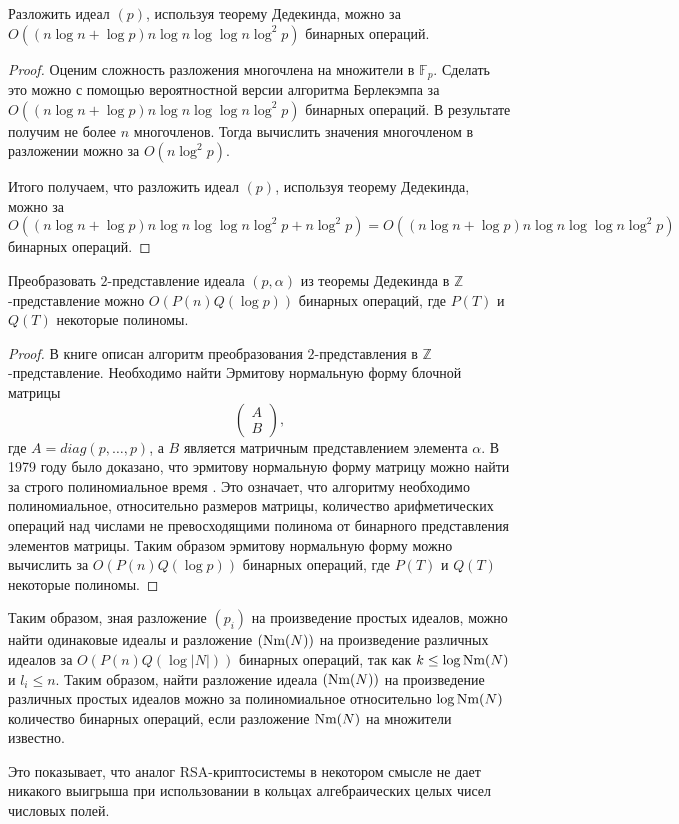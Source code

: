 \documentclass[_00_dissertation.tex]{subfiles}
\begin{document}
\begin{statement}
    Разложить идеал $(p)$, используя теорему Дедекинда, можно за $O((n\log n + \log p)n\log n\log\log n\log^2 p)$ бинарных операций.
\end{statement}
\begin{proof}
    Оценим сложность разложения многочлена на множители в $\mathbb{F}_p$.
    Сделать это можно с помощью вероятностной версии алгоритма Берлекэмпа за $O((n\log n + \log p)n\log n\log\log n\log^2 p)$ бинарных операций.
    В результате получим не более $n$ многочленов.
    Тогда вычислить значения многочленом в разложении можно за $O(n\log^2 p)$.

    Итого получаем, что разложить идеал $(p)$, используя теорему Дедекинда, можно за $O((n\log n + \log p)n\log n\log\log n\log^2 p + n\log^2 p) = O((n\log n + \log p)n\log n\log\log n\log^2 p)$ бинарных операций.
\end{proof}

\begin{statement}
    Преобразовать $2$-представление идеала $(p, \alpha)$ из теоремы Дедекинда в $\mathbb{Z}$-представление можно $O(P(n)Q(\log p))$ бинарных операций, где $P(T)$ и $Q(T)$ некоторые полиномы.
\end{statement}
\begin{proof}
    В книге \cite{Pohst} описан алгоритм преобразования $2$-представления в $\mathbb{Z}$-представление.
    Необходимо найти Эрмитову нормальную форму блочной матрицы
    $$
        \begin{pmatrix}
            A\\
            B
        \end{pmatrix},
    $$
    где $A = diag(p, \dots, p)$, а $B$ является матричным представлением элемента $\alpha$.
    В 1979 году было доказано, что эрмитову нормальную форму матрицу можно найти за строго полиномиальное время \cite{Kannan}.
    Это означает, что алгоритму необходимо полиномиальное, относительно размеров матрицы, количество арифметических операций над числами не превосходящими полинома от бинарного представления элементов матрицы.
    Таким образом эрмитову нормальную форму можно вычислить за $O(P(n)Q(\log p))$ бинарных операций, где $P(T)$ и $Q(T)$ некоторые полиномы.
\end{proof}

\begin{remark}
    Таким образом, зная разложение $(p_i)$ на произведение простых идеалов, можно найти одинаковые идеалы и разложение $(\textrm{Nm}(N))$ на произведение различных идеалов за $O(P(n)Q(\log |N|))$ бинарных операций, так как $k \le \log \textrm{Nm}(N)$ и $l_i \le n$.
    Таким образом, найти разложение идеала $(\textrm{Nm}(N))$ на произведение различных простых идеалов можно за полиномиальное относительно $\log\textrm{Nm}(N)$ количество бинарных операций, если разложение $\textrm{Nm}(N)$ на множители известно.

    Это показывает, что аналог RSA-криптосистемы в некотором смысле не дает никакого выигрыша при использовании в кольцах алгебраических целых чисел числовых полей.
\end{remark}
\end{document}
